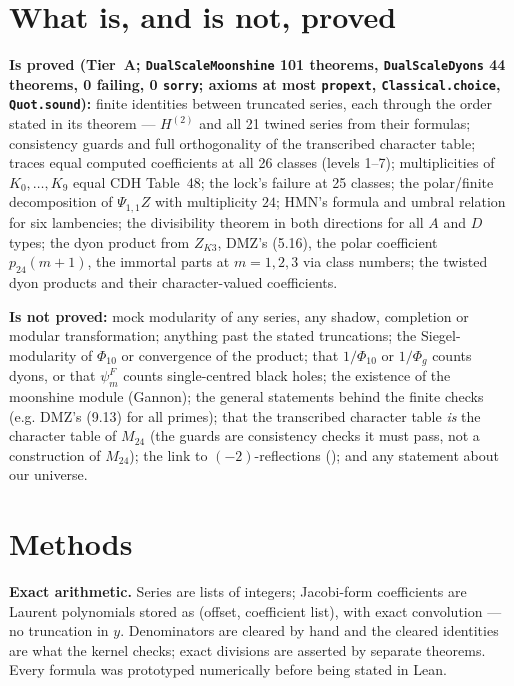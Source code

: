 \documentclass[11pt,a4paper]{article}
\theoremstyle{remark}
\newcommand{\Mtf}{M_{24}}
\begin{document}
\section{What is, and is not, proved}
\label{sec:scope}
\begin{scopebox}
\textbf{Is proved (Tier~A; \texttt{DualScaleMoonshine} 101 theorems, \texttt{DualScaleDyons} 44 theorems,
0 failing, 0 \texttt{sorry}; axioms at most \texttt{propext}, \texttt{Classical.choice}, \texttt{Quot.sound}):}
finite identities between truncated series, each through the order stated in its theorem ---
$H^{(2)}$ and all 21 twined series from their formulas; consistency guards and full orthogonality of the
transcribed character table; traces equal computed coefficients at all 26 classes (levels 1--7);
multiplicities of $K_0,\dots,K_9$ equal CDH Table~48; the lock's failure at 25 classes; the polar/finite
decomposition of $\Psi_{1,1}Z$ with multiplicity $24$; HMN's formula and umbral relation for six
lambencies; the divisibility theorem in both directions for all $A$ and $D$ types; the dyon product from
$Z_{K3}$, DMZ's (5.16), the polar coefficient $p_{24}(m+1)$, the immortal parts at $m=1,2,3$ via class
numbers; the twisted dyon products and their character-valued coefficients.

\textbf{Is not proved:} mock modularity of any series, any shadow, completion or modular transformation;
anything past the stated truncations; the Siegel-modularity of $\Phi_{10}$ or convergence of the product;
that $1/\Phi_{10}$ or $1/\Phi_g$ counts dyons, or that $\psi_m^F$ counts single-centred black holes; the
existence of the moonshine module (Gannon); the general statements behind the finite checks (e.g. DMZ's
(9.13) for all primes); that the transcribed character table \emph{is} the character table of $\Mtf$ (the
guards are consistency checks it must pass, not a construction of $\Mtf$); the link to
$(-2)$-reflections (); and any statement about our universe.
\end{scopebox}

\section{Methods}
\label{sec:methods}
\textbf{Exact arithmetic.} Series are lists of integers; Jacobi-form coefficients are Laurent polynomials
stored as (offset, coefficient list), with exact convolution --- no truncation in $y$. Denominators are
cleared by hand and the cleared identities are what the kernel checks; exact divisions are asserted by
separate theorems. Every formula was prototyped numerically before being stated in Lean.
\end{document}

